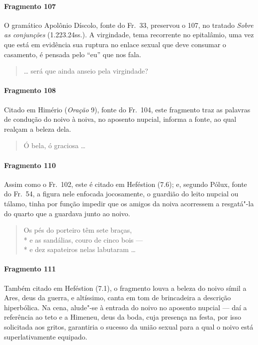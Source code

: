 \paragraph{Fragmento 107}

{\small O gramático Apolônio Díscolo, fonte do Fr.~33, preservou o 107, no tratado
\textit{Sobre as conjunções} (1.223.24ss.). A virgindade, tema recorrente no epitalâmio, uma
vez que está em evidência sua ruptura no enlace sexual que deve consumar o
casamento, é pensada pelo “eu” que nos fala.}

\begin{verse}
\ldots{} será que ainda anseio pela virgindade?
\end{verse}

\paragraph{Fragmento 108}

{\small Citado em Himério (\textit{Oração} 9), fonte do Fr.~104, este fragmento traz as palavras de condução do noivo à noiva, no aposento nupcial, informa a fonte, ao qual realçam a beleza dela.}

\begin{verse}
Ó bela, ó graciosa \ldots{}
\end{verse}

\paragraph{Fragmento 110}

{\small Assim como o Fr.~102, este é citado em Heféstion (7.6); e, segundo Pólux, fonte do Fr.~54, a figura nele enfocada jocosamente, o guardião do leito nupcial ou tálamo,
tinha por função impedir que os amigos da noiva acorressem a resgatá"-la do
quarto que a guardava junto ao noivo.}

\begin{verse}
Os pés do porteiro têm sete braças,\\*
e as sandálias, couro de cinco bois --- \\*
e dez sapateiros nelas labutaram \ldots{}
\end{verse}

\paragraph{Fragmento 111}

{\small Também citado em Heféstion (7.1), o fragmento louva a beleza do noivo símil a Ares,
deus da guerra, e altíssimo, canta em tom de brincadeira a descrição
hiperbólica. Na cena, alude"-se à entrada do noivo no aposento nupcial --- daí a
referência ao teto e a Himeneu, deus da boda, cuja presença na festa, por isso
solicitada aos gritos, garantiria o sucesso da união sexual para a qual o noivo está superlativamente equipado.}

